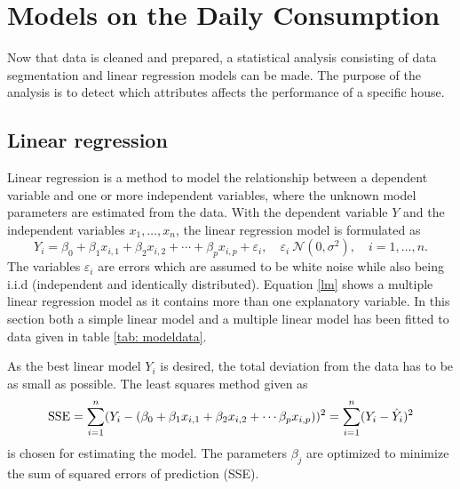 \chapter{Models on the Daily Consumption}
Now that data is cleaned and prepared, a statistical analysis consisting of data segmentation and linear regression models can be made. The purpose of the analysis is to detect which attributes affects the performance of a specific house.

\section{Linear regression}
Linear regression is a method to model the relationship between a dependent variable and one or more independent variables, where the unknown model parameters are estimated from the data. With the dependent variable $Y$ and the independent variables $x_1, \dots, x_n$, the linear regression model is formulated as
\begin{equation}
    Y_i = \beta_0 + \beta_1 x_{i,1} + \beta_2 x_{i,2} + \cdots + \beta_p x_{i,p} + \varepsilon_i, \quad \varepsilon_i ~ \mathcal{N}(0,\sigma^2), \quad i = 1,\dots, n. \label{lm}
\end{equation}
The variables $\varepsilon_i$ are errors which are assumed to be white noise while also being i.i.d (independent and identically distributed). Equation \eqref{lm} shows a multiple linear regression model as it contains more than one explanatory variable. In this section both a simple linear model and a multiple linear model has been fitted to data given in table \ref{tab: modeldata}.

\noindent As the best linear model $Y_i$ is desired, the total deviation from the data has to be as small as possible. The least squares method given as
\begin{equation}
    \text{SSE} = \sum_{i=1}^n (Y_i - (\beta_0 + \beta_1 x_{i,1} + \beta_2 x_{i,2} + \cdots  \beta_p x_{i,p}))^2 = \sum_{i=1}^n (Y_i - \Hat{Y}_i)^2
\end{equation}
is chosen for estimating the model. The parameters $\beta_j$ are optimized to minimize the sum of squared errors of prediction (SSE).

